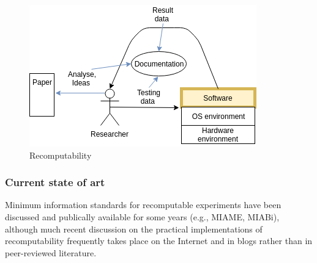 \documentclass{vldb}
\begin{document}
\begin{figure}[h!]
  \includegraphics[scale=0.6]{fig/recomputability.png}
  \caption{Recomputability\cite{gith}}
  \label{fig:recomputability}
\end{figure}
\subsubsection{Current state of art}
Minimum information standards for recomputable experiments have been discussed and publically available for some years (e.g.,  MIAME\cite{MIAME}, MIABi\cite{MIABi}), although much recent discussion on the practical implementations of recomputability frequently takes place on the Internet and in blogs rather than in peer-reviewed literature\cite{ivory}\cite{recomputation}\cite{bioinformaticszen}. 
\end{document}
